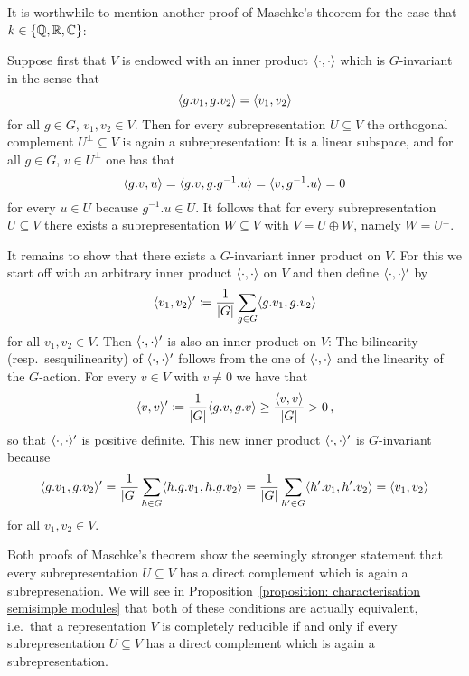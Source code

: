 \begin{fluff}
  \label{fluff: orthogonality proof of Maschke}
  It is worthwhile to mention another proof of Maschke’s theorem for the case that $k \in \{\mathbb{Q}, \mathbb{R}, \mathbb{C}\}$:
  
  Suppose first that $V$ is endowed with an inner product $\langle \cdot, \cdot \rangle$ which is $G$-invariant in the sense that
  \[
      \langle g.v_1, g.v_2 \rangle
    = \langle v_1, v_2 \rangle
  \]
  for all $g \in G$, $v_1, v_2 \in V$.
  Then for every subrepresentation $U \subseteq V$ the orthogonal complement $U^\perp \subseteq V$ is again a subrepresentation:
  It is a linear subspace, and for all $g \in G$, $v \in U^\perp$ one has that
  \[
      \langle g.v, u \rangle
    = \langle g.v, g.g^{-1}.u \rangle
    = \langle v, g^{-1}.u \rangle
    = 0
  \]
  for every $u \in U$ because $g^{-1}.u \in U$.
  It follows that for every subrepresentation $U \subseteq V$ there exists a subrepresentation $W \subseteq V$ with $V = U \oplus W$, namely $W = U^\perp$.
  
  It remains to show that there exists a $G$-invariant inner product on $V$.
  For this we start off with an arbitrary inner product $\langle \cdot, \cdot \rangle$ on $V$ and then define $\langle \cdot, \cdot \rangle'$ by
  \[
              \langle v_1, v_2 \rangle'
    \coloneqq  \frac{1}{|G|} \sum_{g \in G} \langle g.v_1, g.v_2 \rangle
  \]
  for all $v_1, v_2 \in V$.
  Then $\langle \cdot, \cdot \rangle'$ is also an inner product on $V$:
  The bilinearity (resp.\ sesquilinearity) of $\langle \cdot, \cdot \rangle'$ follows from the one of $\langle \cdot, \cdot \rangle$ and the linearity of the $G$-action.
  For every $v \in V$ with $v \neq 0$ we have that
  \[
              \langle v, v \rangle'
    \coloneqq  \frac{1}{|G|} \langle g.v, g.v \rangle
    \geq      \frac{\langle v, v \rangle}{|G|}
    >         0 \,,
  \]
  so that $\langle \cdot, \cdot \rangle'$ is positive definite.
  This new inner product $\langle \cdot, \cdot \rangle'$ is $G$-invariant because
  \[
      \langle g.v_1, g.v_2 \rangle'
    = \frac{1}{|G|} \sum_{h \in G} \langle h.g.v_1, h.g.v_2 \rangle
    = \frac{1}{|G|} \sum_{h' \in G} \langle h'.v_1, h'.v_2 \rangle
    = \langle v_1, v_2 \rangle
  \]
  for all $v_1, v_2 \in V$.
\end{fluff}


\begin{remark}
  Both proofs of Maschke’s theorem show the seemingly stronger statement that every subrepresentation $U \subseteq V$ has a direct complement which is again a subrepresenation.
  We will see in Proposition~\ref{proposition: characterisation semisimple modules} that both of these conditions are actually equivalent, i.e.\ that a representation $V$ is completely reducible if and only if every subrepresentation $U \subseteq V$ has a direct complement which is again a subrepresentation.
\end{remark}


